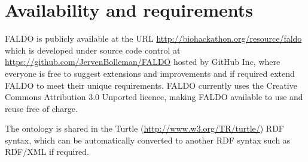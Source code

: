\section*{Availability and requirements}
FALDO is publicly available at the URL \url{http://biohackathon.org/resource/faldo}
which is developed under source code control at
\url{https://github.com/JervenBolleman/FALDO} hosted by GitHub Inc,
where everyone is free to suggest extensions and improvements and if required extend FALDO to meet their unique requirements.
FALDO currently uses the Creative Commons Attribution 3.0 Unported licence,
making FALDO available to use and reuse free of charge.

The ontology is shared in the Turtle (\url{http://www.w3.org/TR/turtle/}) RDF syntax,
which can be automatically converted to another RDF syntax such as RDF/XML if required.
